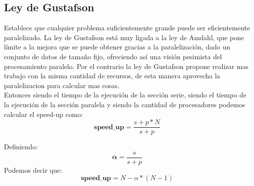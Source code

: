 \subsection{Ley de Gustafson}

Establece que cualquier problema suficientemente grande puede ser eficientemente
paralelizado. La ley de Gustafson está muy ligada a la ley de Amdahl, que pone
límite a la mejora que se puede obtener gracias a la paralelización, dado un
conjunto de datos de tamaño fijo, ofreciendo así una visión pesimista del
procesamiento paralelo. Por el contrario la ley de Gustafson  propone realizar
mas trabajo con la misma cantidad de recursos, de esta manera aprovecha la
paralelizacion para calcular mas cosas.\\

Entonces siendo  el tiempo de la ejecución de la sección serie, siendo
 el tiempo de la ejecución de la sección paralela y siendo  la
cantidad de procesadores podemos calcular el speed-up como:
\begin{equation}
    \textbf{speed\_up} = \dfrac{s+p*N}{s+p}
\end{equation}

Definiendo:
\begin{equation}
    \boldsymbol{\alpha} = \dfrac{s}{s+p}
\end{equation}
Podemos decir que:
\begin{equation}
    \textbf{speed\_up} = N - \alpha * (N-1)
\end{equation}

